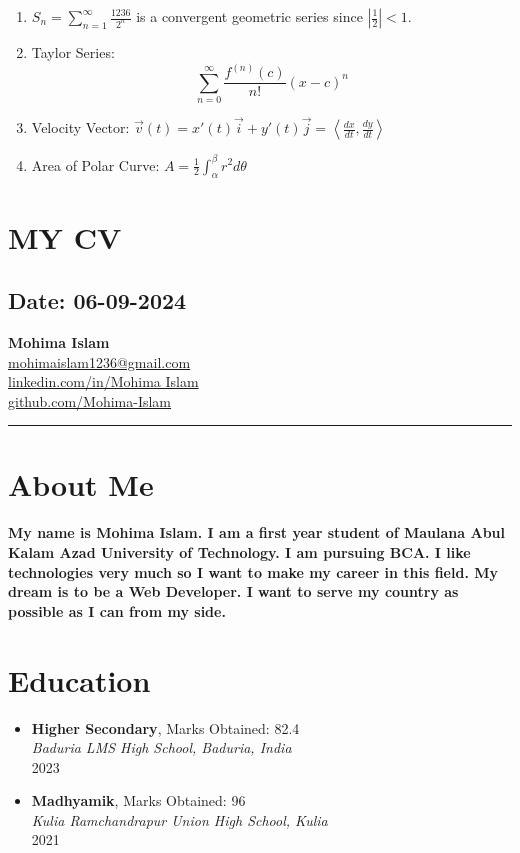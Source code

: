 \documentclass[12pt]{article}
\begin{document}
\begin{enumerate}
    \item $S_n = \sum_{n=1}^{\infty} \frac{1236}{2^n}$ is a convergent geometric series since $\left|\frac{1}{2}\right| < 1$.
    
    \item Taylor Series:
    \[
    \sum_{n=0}^{\infty} \frac{f^{(n)}(c)}{n!} (x - c)^n
    \]
    
    \item Velocity Vector: $\vec{v}(t) = x'(t)\vec{i} + y'(t)\vec{j} = \left\langle \frac{dx}{dt}, \frac{dy}{dt} \right\rangle$
    
    \item Area of Polar Curve: $A = \frac{1}{2} \int_{\alpha}^{\beta} r^2 d\theta$
\end{enumerate}
\newpage
\section{MY CV}
\subsection*{Date: 06-09-2024}
\begin{center}
    {\LARGE \textbf{Mohima Islam}} \\
    \vspace{2mm}
    \href{mailto:mohimaislam1236@gmail.com}{mohimaislam1236@gmail.com} \\
    \href{https://www.linkedin.com/in/Mohima Islam}{linkedin.com/in/Mohima Islam} \\
    \href{https://github.com/Mohima-Islam}{github.com/Mohima-Islam} \\
    \vspace{2mm}
    \hrule
\end{center}
\section*{About Me}
\textbf{My name is Mohima Islam. I am a first year student of Maulana Abul Kalam Azad University of Technology. I am pursuing BCA. I like technologies very much so I want to make my career in this field. My dream is to be a Web Developer. I want to serve my country as possible as I can from my side. }
\section*{Education}
\begin{itemize}[leftmargin=0.5cm]
    \item \textbf{Higher Secondary}, Marks Obtained: 82.4 \\
    \textit{Baduria LMS High School, Baduria, India} \\
    2023
    \item \textbf{Madhyamik}, Marks Obtained: 96\\
    \textit{Kulia Ramchandrapur Union High School, Kulia}\\
    2021
\end{itemize}
\end{document}
